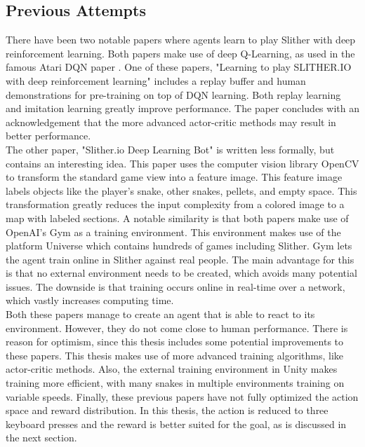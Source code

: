 \subsection{Previous Attempts}  %

There have been two notable papers where agents learn to play Slither with deep reinforcement learning. Both papers make use of deep Q-Learning, as used in the famous Atari DQN paper \cite{Atari_DQN_2013}. One of these papers, "Learning to play SLITHER.IO with deep reinforcement learning" \cite{prev:Slither_2019} includes a replay buffer and human demonstrations for pre-training on top of DQN learning. Both replay learning and imitation learning greatly improve performance. The paper concludes with an acknowledgement that the more advanced actor-critic methods may result in better performance.
\\[2.5mm]
The other paper, "Slither.io Deep Learning Bot" \cite{prev:Slihter_2017_OpenCV} is written less formally, but contains an interesting idea. This paper uses the computer vision library OpenCV to transform the standard game view into a feature image. This feature image labels objects like the player's snake, other snakes, pellets, and empty space. This transformation greatly reduces the input complexity from a colored image to a map with labeled sections.
\newpage \noindent
A notable similarity is that both papers make use of OpenAI's Gym as a training environment. This environment makes use of the platform Universe which contains hundreds of games including Slither. Gym lets the agent train online in Slither against real people. The main advantage for this is that no external environment needs to be created, which avoids many potential issues. The downside is that training occurs online in real-time over a network, which vastly increases computing time.
\\[2.5mm]
Both these papers manage to create an agent that is able to react to its environment. However, they do not come close to human performance. There is reason for optimism, since this thesis includes some potential improvements to these papers. This thesis makes use of more advanced training algorithms, like actor-critic methods. Also, the external training environment in Unity makes training more efficient, with many snakes in multiple environments training on variable speeds. Finally, these previous papers have not fully optimized the action space and reward distribution. In this thesis, the action is reduced to three keyboard presses and the reward is better suited for the goal, as is discussed in the next section.
\\





